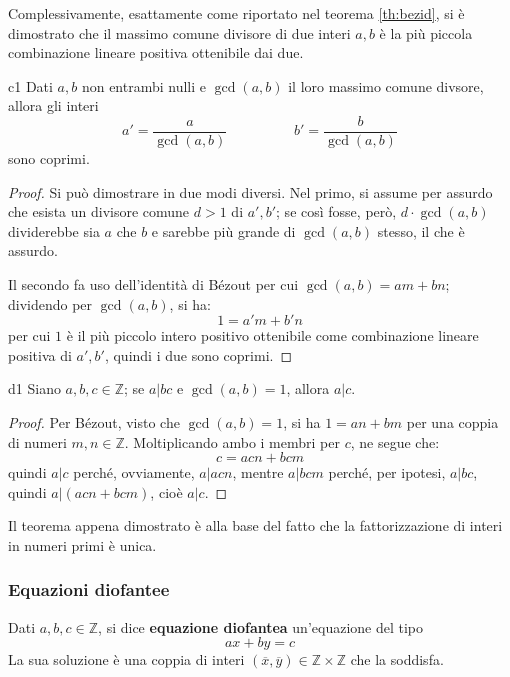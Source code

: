 \documentclass[11pt, a4paper]{scrartcl}
\theoremstyle{definition}
\numberwithin{esempio}{section}
\theoremstyle{definition}
\numberwithin{obs}{section}
\numberwithin{nota}{section}
\numberwithin{equation}{subsection}
\begin{document}
Complessivamente, esattamente come riportato nel teorema \ref{th:bezid}, si \`e dimostrato che il massimo comune divisore di due interi $a,b$ \`e la pi\`u piccola combinazione lineare positiva ottenibile dai due.
\begin{corollario}
	{}{c1}
	Dati $a,b$ non entrambi nulli e $\operatorname{gcd}(a,b) $ il loro massimo comune divsore, allora gli interi 
	\[
		a' = \frac{a}{\operatorname{gcd}(a,b) } \hspace{2cm} b' = \frac{b}{\operatorname{gcd}(a,b) }
	\] 
	sono coprimi.
	\begin{proof}
	Si pu\`o dimostrare in due modi diversi. Nel primo, si assume per assurdo che esista un divisore comune $d> 1 $ di $a' , b'$; se cos\`i fosse, per\`o, $d \cdot \operatorname{gcd}(a,b) $ dividerebbe sia $a$ che $b$ e sarebbe pi\`u grande di $\operatorname{gcd}(a,b) $ stesso, il che \`e assurdo.

	Il secondo fa uso dell'identit\`a di B\'ezout per cui $\operatorname{gcd}(a,b) = am+bn $; dividendo per $\operatorname{gcd}(a,b) $, si ha:
	\[
	1 = a'm + b'n 
	\] 
	per cui $1$ \`e il pi\`u piccolo intero positivo  ottenibile come combinazione lineare positiva di $a', b'$, quindi i due sono coprimi.
	\end{proof}
\end{corollario}
\begin{teorema}
	{}{d1}
	Siano $a,b,c \in \mathbb{Z}$; se $a|bc$ e $\operatorname{gcd}(a,b) =1$, allora $a|c$.
	\begin{proof}
		Per B\'ezout, visto che $\operatorname{gcd}(a,b) = 1$, si ha $1 = an + bm$ per una coppia di numeri $m,n \in \mathbb{Z}$. 
		Moltiplicando ambo i membri per $c$, ne segue che:
		\[
		c = acn + bcm
		\] 
		quindi $a | c$ perch\'e, ovviamente, $a | acn$, mentre $a | bcm$ perch\'e, per ipotesi, $a | bc$, quindi $a| (acn + bcm)$, cio\`e $a | c$.
	\end{proof}
\end{teorema}
\noindent Il teorema appena dimostrato \`e alla base del fatto che la fattorizzazione di interi in numeri primi \`e unica.

\subsubsection{Equazioni diofantee}


Dati $a,b,c \in \mathbb{Z}$, si dice \textbf{equazione diofantea} un'equazione del tipo	
\begin{equation}
	ax + by = c
\end{equation}
La sua soluzione \`e una coppia di interi $(\overline{x},\overline{y}) \in \mathbb{Z} \times \mathbb{Z}$ che la soddisfa.
\end{document}
